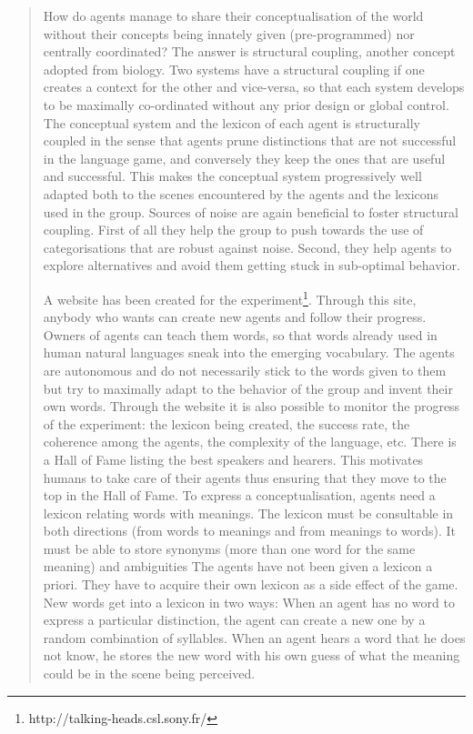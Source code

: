 \begin{quotation}
How do agents manage to share their conceptualisation of the world without their concepts being innately given (pre-programmed) nor centrally coordinated? The answer is structural coupling, another concept adopted from biology. Two systems have a structural coupling if one creates a context for the other and vice-versa, so that each system develops to be maximally co-ordinated without any prior design or global control. The conceptual system and the lexicon of each agent is structurally coupled in the sense that agents prune distinctions that are not successful in the language game, and conversely they keep the ones that are useful and successful. This makes the conceptual system progressively well adapted both to the scenes encountered by the agents and the lexicons used in the group. Sources of noise are again beneficial to foster structural coupling. First of all they help the group to push towards the use of categorisations that are robust against noise. Second, they help agents to explore alternatives and avoid them getting stuck in sub-optimal behavior.

A website has been created for the experiment\footnote{http://talking-heads.csl.sony.fr/}. Through this site, anybody who wants can create new agents and follow their progress. Owners of agents can teach them words, so that words already used in human natural languages sneak into the emerging vocabulary. The agents are autonomous and do not necessarily stick to the words given to them but try to maximally adapt to the behavior of the group and invent their own words. Through the website it is also possible to monitor the progress of the experiment: the lexicon being created, the success rate, the coherence among the agents, the complexity of the language, etc. There is a Hall of Fame listing the best speakers and hearers. This motivates humans to take care of their agents thus ensuring that they move to the top in the Hall of Fame.
\clearpage
To express a conceptualisation, agents need a lexicon relating words with meanings. The lexicon must be consultable in both directions (from words to meanings and from meanings to words). It must be able to store synonyms (more than one word for the same meaning) and ambiguities The agents have not been given a lexicon a priori. They have to acquire their own lexicon as a side effect of the game. New words get into a lexicon in two ways: When an agent has no word to express a particular distinction, the agent can create a new one by a random combination of syllables. When an agent hears a word that he does not know, he stores the new word with his own guess of what the meaning could be in the scene being perceived.


\end{quotation}
